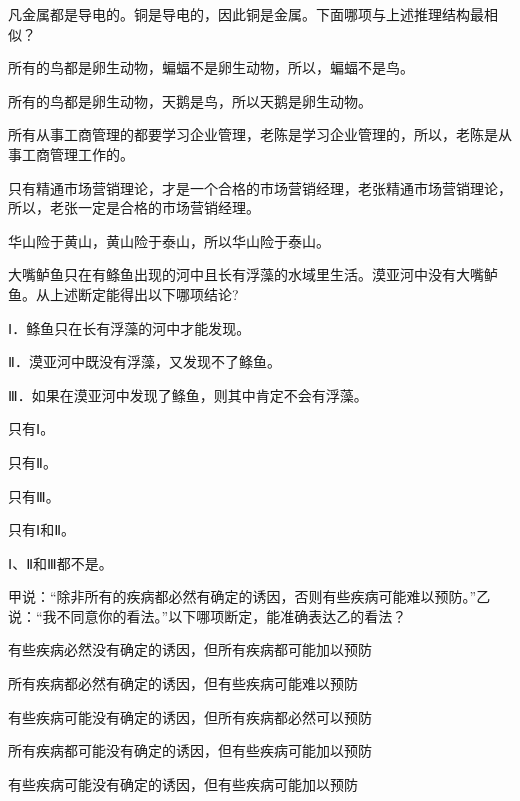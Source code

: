 \documentclass{exam-zh}
\begin{document}
\begin{question}
凡金属都是导电的。铜是导电的，因此铜是金属。下面哪项与上述推理结构最相似？ \paren[]
\begin{choices}
  \item 所有的鸟都是卵生动物，蝙蝠不是卵生动物，所以，蝙蝠不是鸟。
  \item 所有的鸟都是卵生动物，天鹅是鸟，所以天鹅是卵生动物。
  \item 所有从事工商管理的都要学习企业管理，老陈是学习企业管理的，所以，老陈是从事工商管理工作的。
  \item 只有精通市场营销理论，才是一个合格的市场营销经理，老张精通市场营销理论，所以，老张一定是合格的市场营销经理。
  \item 华山险于黄山，黄山险于泰山，所以华山险于泰山。
\end{choices}
\end{question}

\begin{question}
大嘴鲈鱼只在有鲦鱼出现的河中且长有浮藻的水域里生活。漠亚河中没有大嘴鲈鱼。从上述断定能得出以下哪项结论? \paren[]

Ⅰ．鲦鱼只在长有浮藻的河中才能发现。

Ⅱ．漠亚河中既没有浮藻，又发现不了鲦鱼。

Ⅲ．如果在漠亚河中发现了鲦鱼，则其中肯定不会有浮藻。
\begin{choices}
  \item 只有Ⅰ。
  \item 只有Ⅱ。
  \item 只有Ⅲ。
  \item 只有Ⅰ和Ⅱ。
  \item Ⅰ、Ⅱ和Ⅲ都不是。
\end{choices}
\end{question}

\begin{question}
甲说：“除非所有的疾病都必然有确定的诱因，否则有些疾病可能难以预防。”乙说：“我不同意你的看法。”以下哪项断定，能准确表达乙的看法？ \paren[]
\begin{choices}
  \item 有些疾病必然没有确定的诱因，但所有疾病都可能加以预防
  \item 所有疾病都必然有确定的诱因，但有些疾病可能难以预防
  \item 有些疾病可能没有确定的诱因，但所有疾病都必然可以预防
  \item 所有疾病都可能没有确定的诱因，但有些疾病可能加以预防
  \item 有些疾病可能没有确定的诱因，但有些疾病可能加以预防
\end{choices}
\end{question}
\end{document}
